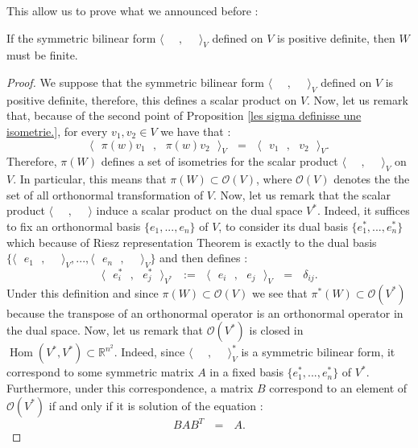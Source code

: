 \documentclass[envcountsame,envcountchap]{svmono}
\DeclareMathOperator{\Hom}{Hom}
\newcommand{\R}{\mathbb R}
\newcommand{\sub}{\subset}
\newcommand{\prods}[2]{\langle\qq #1\qq,\qq#2\qq\rangle}
\newcommand{\qq}{\text{ }}
\begin{document}
This allow us to prove what we announced before :
\begin{theorem}
	If the symmetric bilinear form  $\prods{}{}_V$ defined on $V$ is positive definite, then $W$ must be finite.
\end{theorem}
\begin{proof}
	We suppose that the symmetric bilinear form $\prods{}{}_V$ defined on $V$ is positive definite, therefore, this defines a scalar product on $V$. Now, let us remark that, because of the second point of Proposition \ref{les sigma definisse une isometrie.}, for every $v_1,v_2\in V$ we have that :
	\begin{equation}
	\prods{\pi(w)v_1}{\pi(w)v_2}_V\qq=\qq \prods{v_1}{v_2}_V.
	\end{equation}
	Therefore,  $\pi(W)$ defines a set of isometries for the scalar product $\prods{}{}_V$ on $V$. In particular, this means that $\pi(W)\sub \mathcal{O}(V)$, where $\mathcal{O}(V)$ denotes the the set of all orthonormal transformation of $V$.
	Now, let us remark that the scalar product $\prods{}{}$ induce a scalar product on the dual space $V^*$. Indeed, it suffices to fix an orthonormal basis $\{e_1,...,e_n\}$ of $V$, to consider its dual basis $\{e_1^*,...,e_n^*\}$ which because of Riesz representation Theorem is exactly to the dual basis $\{\prods{e_1}{}_V,...,\prods{e_n}{}_V\}$ and then defines :
	\begin{equation}
	\prods{e_i^*}{e_j^*}_{V^*}\qq:=\qq\prods{e_i}{e_j}_V\qq=\qq \delta_{ij}.
	\end{equation} 
	Under this definition and since $\pi(W)\sub \mathcal{O}(V)$ we see that $\pi^*(W)\sub \mathcal{O}(V^*)$ because the transpose of an orthonormal operator is an orthonormal operator in the dual space. Now, let us remark that $\mathcal{O}(V^*)$ is closed in $\Hom(V^*,V^*)\sub \R^{n^2}$. Indeed, since $\prods{}{}_V^*$ is a symmetric bilinear form, it correspond to some symmetric matrix $A$ in a fixed basis $\{e_1^*,...,e_n^*\}$ of $V^*$. Furthermore, under this correspondence, a matrix $B$ correspond to an element of $\mathcal{O}(V^*)$ if and only if it is solution of the equation :
	 \begin{equation}
	 BAB^T\qq=\qq A.
	 \end{equation}

\end{proof}
\end{document}
